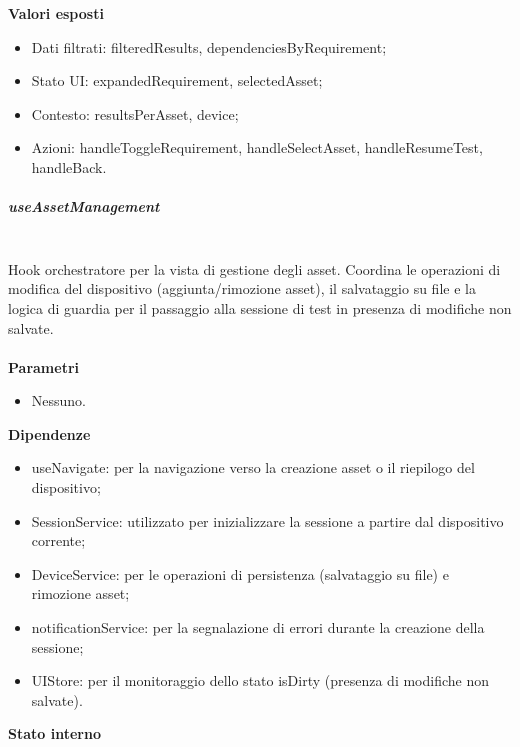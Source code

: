 \documentclass[a4paper,12pt]{article}
\begin{document}
                \textbf{Valori esposti}
                \begin{itemize}
                    \item Dati filtrati: {\ttfamily filteredResults}, {\ttfamily dependenciesByRequirement};
                    \item Stato UI: {\ttfamily expandedRequirement}, {\ttfamily selectedAsset};
                    \item Contesto: {\ttfamily resultsPerAsset}, {\ttfamily device};
                    \item Azioni: {\ttfamily handleToggleRequirement}, {\ttfamily handleSelectAsset}, {\ttfamily handleResumeTest}, {\ttfamily handleBack}.
                \end{itemize}
                
                \subparagraph{useAssetManagement}\mbox{}\\
                Hook orchestratore per la vista di gestione degli asset. Coordina le operazioni di modifica del dispositivo (aggiunta/rimozione asset), il salvataggio su file e la logica di guardia per il passaggio alla sessione di test in presenza di modifiche non salvate.\\\\
                \textbf{Parametri}
                \begin{itemize}
                    \item Nessuno.
                \end{itemize}
                \textbf{Dipendenze}
                \begin{itemize}
                    \item {\ttfamily useNavigate}: per la navigazione verso la creazione asset o il riepilogo del dispositivo;
                    \item {\ttfamily SessionService}: utilizzato per inizializzare la sessione a partire dal dispositivo corrente;
                    \item {\ttfamily DeviceService}: per le operazioni di persistenza (salvataggio su file) e rimozione asset;
                    \item {\ttfamily notificationService}: per la segnalazione di errori durante la creazione della sessione;
                    \item {\ttfamily UIStore}: per il monitoraggio dello stato {\ttfamily isDirty} (presenza di modifiche non salvate).
                \end{itemize}
                \textbf{Stato interno}
\end{document}
